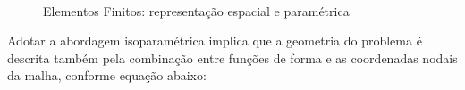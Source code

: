 \documentclass[tese_patricia]{subfiles}%
\begin{document}
\begin{figure}[!htb]
	\centering	
	\\
	\caption{Elementos Finitos: representação espacial e paramétrica}
\end{figure}

Adotar a abordagem isoparamétrica implica que a geometria do problema é descrita também pela combinação entre funções de forma e as coordenadas nodais da malha, conforme equação abaixo:
\end{document}
